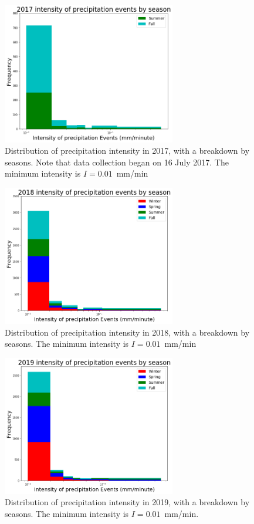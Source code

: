 \documentclass[11pt]{report}
\begin{document}
\clearpage
\begin{figure}[t]
	\centering
	\includegraphics[width=0.675\textwidth]{Figures/inten2017.png}
	\caption[Intensity histogram for 2017 broken down by season]
	{\label{i2017}Distribution of precipitation intensity in 2017,
		with a breakdown by seasons. Note that data collection began on 16
		July 2017. The minimum intensity is
		$I=0.01$~mm/min}
\end{figure}
\begin{figure}[b]
	\centering
	\includegraphics[width=0.675\textwidth]{Figures/inten2018.png}
	\caption[Intensity histogram for 2018 broken down by season]
	{\label{i2018}Distribution of precipitation intensity in 2018,
		with a breakdown by seasons. The minimum intensity is 
		$I=0.01$~mm/min}
\end{figure}
\clearpage
\begin{figure}[t]
	\centering
	\includegraphics[width=0.675\textwidth]{Figures/inten2019.png}
	\caption[Intensity histogram for 2019 broken down by season]
	{\label{i2019}Distribution of precipitation intensity in
		2019, with a breakdown by seasons. The minimum intensity is
		$I=0.01$~mm/min. 
	}
\end{figure}
\end{document}
